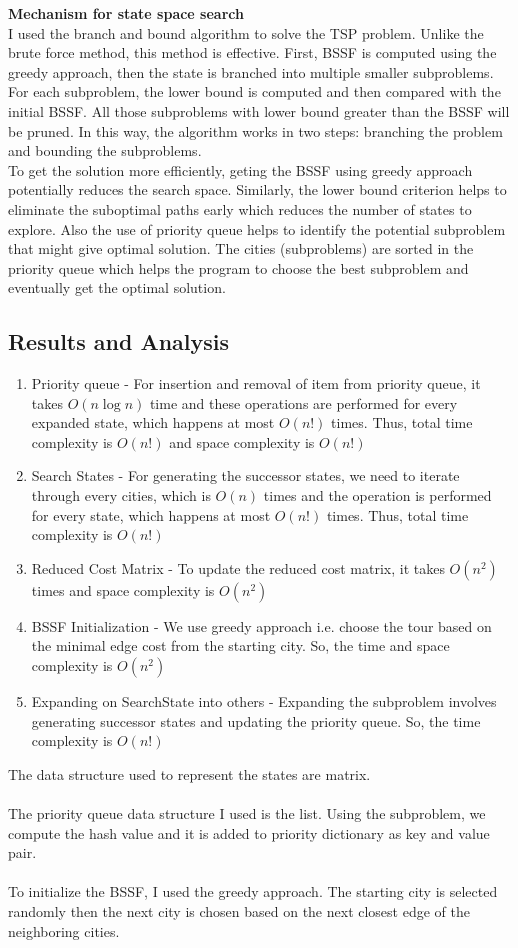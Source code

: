 \documentclass[12pt]{article}
\begin{document}
\textbf{Mechanism for state space search}\\
I used the branch and bound algorithm to solve the TSP problem. Unlike the brute force method, this method is effective. First, BSSF is computed using the greedy approach, then the state is branched into multiple smaller subproblems.
For each subproblem, the lower bound is computed and then compared with the initial BSSF. All those subproblems with lower bound greater than the BSSF will be pruned. In this way, the algorithm 
works in two steps: branching the problem and bounding the subproblems. \\
To get the solution more efficiently, geting the BSSF using greedy approach potentially reduces the search space. Similarly, the lower bound criterion helps to eliminate the suboptimal paths early which 
reduces the number of states to explore. Also the use of priority queue helps to identify the potential subproblem that might give optimal solution. The cities (subproblems) are sorted in
 the priority queue which helps the program to choose the best subproblem and eventually get the optimal solution.


\subsection{Results and Analysis}
\begin{enumerate}
    \item Priority queue - For insertion and removal of item from priority queue, it takes $O(n \log n)$ time and these operations are performed for every expanded state, which happens at most $O(n!)$ times. Thus, total time complexity is $O(n!)$ and space complexity is $O(n!)$
    \item Search States - For generating the successor states, we need to iterate through every cities, which is $O(n)$ times and
    the operation is performed for every state, which happens at most $O(n!)$ times. Thus, total time complexity is $O(n!)$ 
    \item Reduced Cost Matrix - To update the reduced cost matrix, it takes $O(n^2)$ times and space complexity is $O(n^2)$
    \item BSSF Initialization - We use greedy approach i.e. choose the tour based on the minimal edge cost from the starting city. So, the time and space complexity is $O(n^2)$
    \item Expanding on SearchState into others - Expanding the subproblem involves generating successor states and updating the priority queue. So, the time complexity is $O(n!)$
\end{enumerate}
\noindent The data structure used to represent the states are matrix. \\ \\
The priority queue data structure I used is the list. Using the subproblem, we compute the hash value and it is added to priority dictionary as key and value pair.\\ \\
To initialize the BSSF, I used the greedy approach. The starting city is selected randomly then the next city is chosen based on the next closest edge of the neighboring cities.
\end{document}
